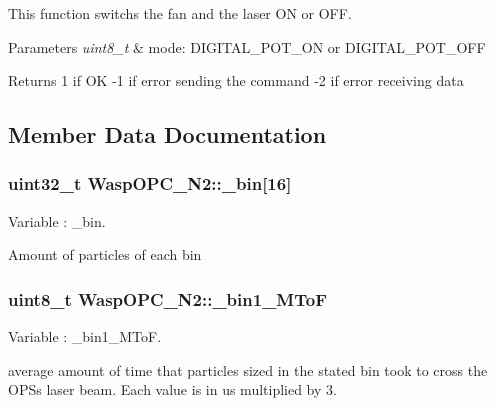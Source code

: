 This function switchs the fan and the laser ON or O\+FF. 


\begin{DoxyParams}{Parameters}
{\em uint8\+\_\+t} & mode\+: D\+I\+G\+I\+T\+A\+L\+\_\+\+P\+O\+T\+\_\+\+ON or D\+I\+G\+I\+T\+A\+L\+\_\+\+P\+O\+T\+\_\+\+O\+FF \\
\hline
\end{DoxyParams}
\begin{DoxyReturn}{Returns}
1 if OK -\/1 if error sending the command -\/2 if error receiving data 
\end{DoxyReturn}


\subsection{Member Data Documentation}
\subsubsection[{\texorpdfstring{\+\_\+bin}{_bin}}]{\setlength{\rightskip}{0pt plus 5cm}uint32\+\_\+t Wasp\+O\+P\+C\+\_\+\+N2\+::\+\_\+bin\mbox{[}16\mbox{]}}\hypertarget{class_wasp_o_p_c___n2_acd6d3c076e84551906f17691b38b6804}{}\label{class_wasp_o_p_c___n2_acd6d3c076e84551906f17691b38b6804}


Variable \+: \+\_\+bin. 

Amount of particles of each bin 
\subsubsection[{\texorpdfstring{\+\_\+bin1\+\_\+\+M\+ToF}{_bin1_MToF}}]{\setlength{\rightskip}{0pt plus 5cm}uint8\+\_\+t Wasp\+O\+P\+C\+\_\+\+N2\+::\+\_\+bin1\+\_\+\+M\+ToF}\hypertarget{class_wasp_o_p_c___n2_aa2fb33126d694778465b577b74b252b0}{}\label{class_wasp_o_p_c___n2_aa2fb33126d694778465b577b74b252b0}


Variable \+: \+\_\+bin1\+\_\+\+M\+ToF. 

average amount of time that particles sized in the stated bin took to cross the O\+PS\textquotesingle{}s laser beam. Each value is in us multiplied by 3. 
